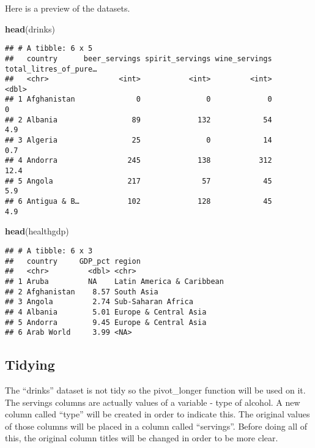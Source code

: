 \documentclass[]{article}
\newenvironment{Shaded}{\begin{snugshade}}{\end{snugshade}}
\newcommand{\KeywordTok}[1]{\textcolor[rgb]{0.13,0.29,0.53}{\textbf{#1}}}
\newcommand{\NormalTok}[1]{#1}
\begin{document}
Here is a preview of the datasets.

\begin{Shaded}
\begin{Highlighting}[]
\KeywordTok{head}\NormalTok{(drinks)}
\end{Highlighting}
\end{Shaded}

\begin{verbatim}
## # A tibble: 6 x 5
##   country      beer_servings spirit_servings wine_servings total_litres_of_pure…
##   <chr>                <int>           <int>         <int>                 <dbl>
## 1 Afghanistan              0               0             0                   0  
## 2 Albania                 89             132            54                   4.9
## 3 Algeria                 25               0            14                   0.7
## 4 Andorra                245             138           312                  12.4
## 5 Angola                 217              57            45                   5.9
## 6 Antigua & B…           102             128            45                   4.9
\end{verbatim}

\begin{Shaded}
\begin{Highlighting}[]
\KeywordTok{head}\NormalTok{(healthgdp)}
\end{Highlighting}
\end{Shaded}

\begin{verbatim}
## # A tibble: 6 x 3
##   country     GDP_pct region                   
##   <chr>         <dbl> <chr>                    
## 1 Aruba         NA    Latin America & Caribbean
## 2 Afghanistan    8.57 South Asia               
## 3 Angola         2.74 Sub-Saharan Africa       
## 4 Albania        5.01 Europe & Central Asia    
## 5 Andorra        9.45 Europe & Central Asia    
## 6 Arab World     3.99 <NA>
\end{verbatim}

\subsection{Tidying}\label{tidying}

The ``drinks'' dataset is not tidy so the pivot\_longer function will be
used on it. The servings columns are actually values of a variable -
type of alcohol. A new column called ``type'' will be created in order
to indicate this. The original values of those columns will be placed in
a column called ``servings''. Before doing all of this, the original
column titles will be changed in order to be more clear.
\end{document}
